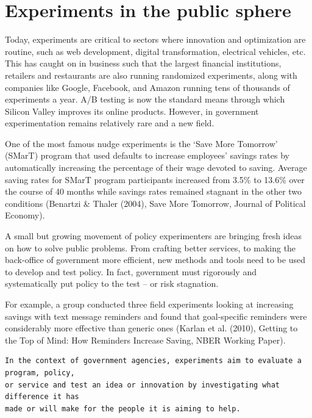 \documentclass[openany]{book}
\begin{document}
\hypertarget{experiments-in-the-public-sphere}{%
\section{Experiments in the public sphere}\label{experiments-in-the-public-sphere}}

Today, experiments are critical to sectors where innovation and optimization are routine, such as web development, digital transformation, electrical vehicles, etc. This has caught on in business such that the largest financial institutions, retailers and restaurants are also running randomized experiments, along with companies like Google, Facebook, and Amazon running tens of thousands of experiments a year. A/B testing is now the standard means through which Silicon Valley improves its online products. However, in government experimentation remains relatively rare and a new field.

One of the most famous nudge experiments is the `Save More Tomorrow' (SMarT) program that used defaults to increase employees' savings rates by automatically increasing the percentage of their wage devoted to saving. Average saving rates for SMarT program participants increased from 3.5\% to 13.6\% over the course of 40 months while savings rates remained stagnant in the other two conditions (Benartzi \& Thaler (2004), Save More Tomorrow, Journal of Political Economy).

A small but growing movement of policy experimenters are bringing fresh ideas on how to solve public problems. From crafting better services, to making the back-office of government more efficient, new methods and tools need to be used to develop and test policy. In fact, government must rigorously and systematically put policy to the test -- or risk stagnation.

For example, a group conducted three field experiments looking at increasing savings with
text message reminders and found that goal-specific reminders were considerably more effective than
generic ones (Karlan et al. (2010), Getting to the Top of Mind: How Reminders Increase Saving,
NBER Working Paper).

\begin{verbatim}
In the context of government agencies, experiments aim to evaluate a program, policy, 
or service and test an idea or innovation by investigating what difference it has 
made or will make for the people it is aiming to help. 
\end{verbatim}
\end{document}
